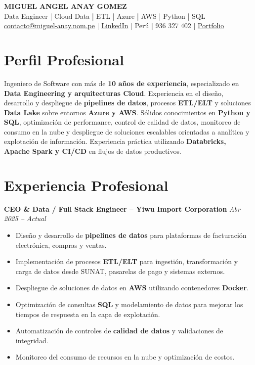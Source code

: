 \documentclass[11pt,a4paper]{article}
\begin{document}
\begin{center}
{\Large \textbf{MIGUEL ANGEL ANAY GOMEZ}}\\
Data Engineer | Cloud Data | ETL | Azure | AWS | Python | SQL\\
\vspace{4pt}
\href{mailto:contacto@miguel-anay.nom.pe}{contacto@miguel-anay.nom.pe} |
\href{https://www.linkedin.com/in/miguel-anay}{LinkedIn} |
Perú |
936 327 402 |
\href{https://portfolio.miguel-anay.nom.pe}{Portfolio}
\end{center}

\vspace{6pt}

\section*{Perfil Profesional}

Ingeniero de Software con más de \textbf{10 años de experiencia}, especializado en \textbf{Data Engineering y arquitecturas Cloud}.  
Experiencia en el diseño, desarrollo y despliegue de \textbf{pipelines de datos}, procesos \textbf{ETL/ELT} y soluciones \textbf{Data Lake} sobre entornos \textbf{Azure y AWS}.  
Sólidos conocimientos en \textbf{Python y SQL}, optimización de performance, control de calidad de datos, monitoreo de consumo en la nube y despliegue de soluciones escalables orientadas a analítica y explotación de información.  
Experiencia práctica utilizando \textbf{Databricks, Apache Spark y CI/CD} en flujos de datos productivos.

\vspace{6pt}

\section*{Experiencia Profesional}

\textbf{CEO \& Data / Full Stack Engineer – Yiwu Import Corporation} \hfill \textit{Abr 2025 – Actual}
\begin{itemize}[leftmargin=*]
  \item Diseño y desarrollo de \textbf{pipelines de datos} para plataformas de facturación electrónica, compras y ventas.
  \item Implementación de procesos \textbf{ETL/ELT} para ingestión, transformación y carga de datos desde SUNAT, pasarelas de pago y sistemas externos.
  \item Despliegue de soluciones de datos en \textbf{AWS} utilizando contenedores \textbf{Docker}.
  \item Optimización de consultas \textbf{SQL} y modelamiento de datos para mejorar los tiempos de respuesta en la capa de explotación.
  \item Automatización de controles de \textbf{calidad de datos} y validaciones de integridad.
  \item Monitoreo del consumo de recursos en la nube y optimización de costos.
\end{itemize}
\end{document}
